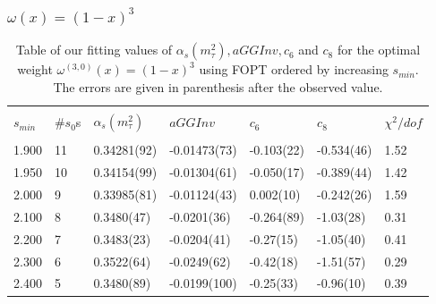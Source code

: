 \documentclass[../../index.tex]{subfiles}
\begin{document}
\subsubsection{$\omega(x) = (1-x)^3$}
\begin{table}[H]
  \centering
  \begin{tabular}{lllllll}
    \toprule \\
    $s_{min}$ & \#$s_0$s & $\alpha_s(m_\tau^2)$ & $aGGInv$ & $c_{6}$ & $c_{8}$ & $\chi^2/dof$  \\
    \hline \\
    1.900 & 11 & 0.34281(92) & -0.01473(73) & -0.103(22) & -0.534(46) & 1.52 \\
    1.950 & 10 & 0.34154(99) & -0.01304(61) & -0.050(17) & -0.389(44) & 1.42 \\
    2.000 & 9  & 0.33985(81) & -0.01124(43) & 0.002(10) & -0.242(26) & 1.59 \\
    2.100 & 8  & 0.3480(47) & -0.0201(36) & -0.264(89) & -1.03(28) & 0.31 \\
    2.200 & 7  & 0.3483(23) & -0.0204(41) & -0.27(15) & -1.05(40) & 0.41 \\
    2.300 & 6  & 0.3522(64) & -0.0249(62) & -0.42(18) & -1.51(57) & 0.29 \\
    2.400 & 5  & 0.3480(89) & -0.0199(100) & -0.25(33) & -0.96(10) & 0.39 \\
    \bottomrule
  \end{tabular}
  \caption{Table of our fitting values of $\alpha_s(m_\tau^2), aGGInv, c_6$ and $c_{8}$
    for the optimal weight $\omega^{(3,0)}(x)=(1-x)^3$ using FOPT ordered
    by increasing $s_{min}$. The errors are given in parenthesis after the observed value.}
  \label{table:fitOpt30AlD4D6D8}
\end{table}

\newpage
\end{document}
